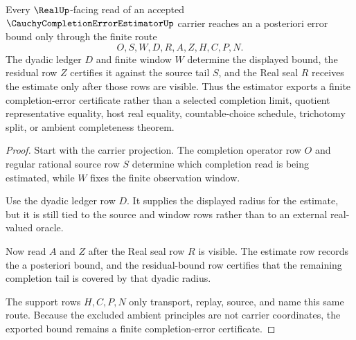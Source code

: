 \begin{theorem}
\label{thm:cauchy-completion-error-estimator-aposteriori-bound}
Every $\RealUp$-facing read of an accepted $\CauchyCompletionErrorEstimatorUp$ carrier reaches an a posteriori error bound only through the finite route
$$
O,S,W,D,R,A,Z,H,C,P,N .
$$
The dyadic ledger $D$ and finite window $W$ determine the displayed bound, the residual row $Z$ certifies it against the source tail $S$, and the Real seal $R$ receives the estimate only after those rows are visible. Thus the estimator exports a finite completion-error certificate rather than a selected completion limit, quotient representative equality, host real equality, countable-choice schedule, trichotomy split, or ambient completeness theorem.
\end{theorem}
\begin{proof}
Start with the carrier projection. The completion operator row $O$ and regular rational source row $S$ determine which completion read is being estimated, while $W$ fixes the finite observation window.

Use the dyadic ledger row $D$. It supplies the displayed radius for the estimate, but it is still tied to the source and window rows rather than to an external real-valued oracle.

Now read $A$ and $Z$ after the Real seal row $R$ is visible. The estimate row records the a posteriori bound, and the residual-bound row certifies that the remaining completion tail is covered by that dyadic radius.

The support rows $H,C,P,N$ only transport, replay, source, and name this same route. Because the excluded ambient principles are not carrier coordinates, the exported bound remains a finite completion-error certificate.
\end{proof}



